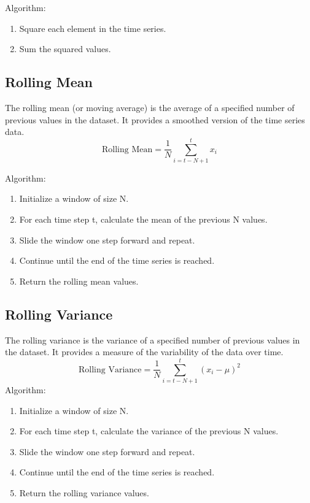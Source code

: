 Algorithm:
\begin{enumerate}
    \item Square each element in the time series.
    \item Sum the squared values.
\end{enumerate}

\subsection{Rolling Mean}
The rolling mean (or moving average) is the average of a specified number of previous values in the dataset. It provides a smoothed version of the time series data.
\begin{equation}
    \text{Rolling Mean} = \dfrac{1}{N} \sum_{i=t-N+1}^{t} x_i
    \label{eq:rolling_mean}
\end{equation}

Algorithm:
\begin{enumerate}
    \item Initialize a window of size N.
    \item For each time step t, calculate the mean of the previous N values.
    \item Slide the window one step forward and repeat.
    \item Continue until the end of the time series is reached.
    \item Return the rolling mean values.
\end{enumerate}

\subsection{Rolling Variance}
The rolling variance is the variance of a specified number of previous values in the dataset. It provides a measure of the variability of the data over time.
\begin{equation}
    \text{Rolling Variance} = \dfrac{1}{N} \sum_{i=t-N+1}^{t} (x_i - \mu)^2
    \label{eq:rolling_variance}
\end{equation}
Algorithm:
\begin{enumerate}
    \item Initialize a window of size N.
    \item For each time step t, calculate the variance of the previous N values.
    \item Slide the window one step forward and repeat.
    \item Continue until the end of the time series is reached.
    \item Return the rolling variance values.
\end{enumerate}

